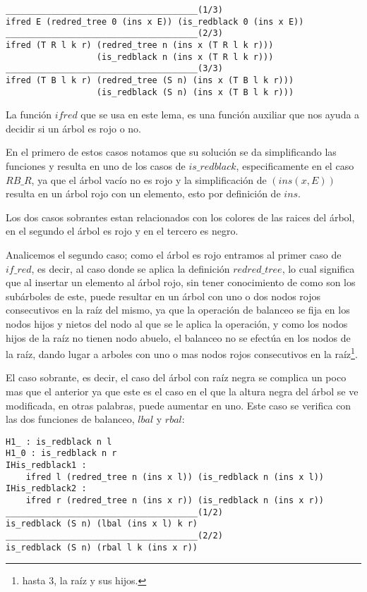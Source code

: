  \begin{verbatim}
______________________________________(1/3)
ifred E (redred_tree 0 (ins x E)) (is_redblack 0 (ins x E))
______________________________________(2/3)
ifred (T R l k r) (redred_tree n (ins x (T R l k r)))
                  (is_redblack n (ins x (T R l k r)))
______________________________________(3/3)
ifred (T B l k r) (redred_tree (S n) (ins x (T B l k r)))
                  (is_redblack (S n) (ins x (T B l k r)))
 \end{verbatim}

La funci\'on $ifred$ que se usa en este lema, es una funci\'on auxiliar que nos ayuda a decidir si
un \'arbol es rojo o no.

En el primero de estos casos notamos que su soluci\'on se da simplificando las funciones y resulta
en uno de los casos de $is\_redblack$, especificamente en el caso $RB\_R$, ya que el \'arbol vacío
no es rojo y la simplificaci\'on de $(ins(x,E))$ resulta en un \'arbol rojo con un elemento, esto
por definici\'on de $ins$.

Los dos casos sobrantes estan relacionados con los colores de las raices del \'arbol, en el
segundo el \'arbol es rojo y en el tercero es negro.

Analicemos el segundo caso; como el \'arbol es rojo entramos al primer caso de $if\_red$, es decir,
al caso donde se aplica la definici\'on $redred\_tree$, lo cual significa que al insertar un elemento al
\'arbol rojo, sin tener conocimiento de como son los subárboles de este, puede resultar en un
\'arbol con uno o dos nodos rojos consecutivos en la ra\'iz del mismo, ya que la operaci\'on de
balanceo se fija en los nodos hijos y nietos del nodo al que se le aplica la operaci\'on, y como
los nodos hijos de la raíz no tienen nodo abuelo, el balanceo no se efectúa en los nodos
de la raíz, dando lugar a arboles con uno o mas nodos rojos consecutivos en la raíz\footnote{hasta 3, la raíz y
sus hijos.}.

El caso sobrante, es decir, el caso del \'arbol con raíz negra se
complica un poco mas que el anterior ya que este es el caso en el que la altura negra del \'arbol
se ve modificada, en otras palabras, puede aumentar en uno. Este caso se verifica con las dos funciones de balanceo, $lbal$ y $rbal$:

\begin{verbatim}
H1_ : is_redblack n l
H1_0 : is_redblack n r
IHis_redblack1 :
    ifred l (redred_tree n (ins x l)) (is_redblack n (ins x l))
IHis_redblack2 :
    ifred r (redred_tree n (ins x r)) (is_redblack n (ins x r))
______________________________________(1/2)
is_redblack (S n) (lbal (ins x l) k r)
______________________________________(2/2)
is_redblack (S n) (rbal l k (ins x r))
\end{verbatim}

